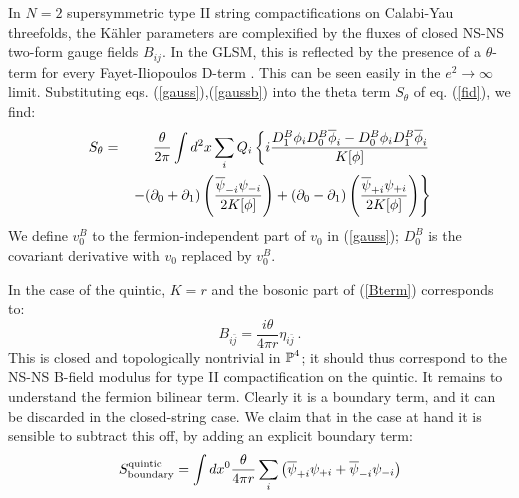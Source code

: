 \documentclass[a4paper,12pt]{article}
\begin{document}
In $N=2$ supersymmetric 
type II string compactifications on Calabi-Yau
threefolds, the K\"ahler parameters
are complexified by the fluxes of closed
NS-NS two-form gauge fields $B_{ij}$. In the GLSM, this is
reflected by the presence of a $\theta$-term for every 
Fayet-Iliopoulos D-term \cite{wittenphases}.
This can be seen easily in the
$e^2 \rightarrow \infty$ limit.  Substituting
eqs. (\ref{gauss}),(\ref{gaussb}) into the theta term
$S_\theta$ of eq. (\ref{fid}), we find: 
\begin{eqnarray}
S_{\theta}&=&{\theta\over {2 \pi }} \int d^2 x  \sum_i Q_i\left\{ 
i{{D^B_1 \phi_i D^B_0 \overline{\phi}_i -
D^B_0 \phi_i D^B_1 \overline{\phi}_i}\over{K[\phi]}}\right. \nonumber \\
&& \left.-(\partial_0+\partial_1) 
\left({{\overline{\psi}_{-i} \psi_{-i}}\over
{2K[\phi]}}\right)
 +(\partial_0-\partial_1) \left({{\overline{\psi}_{+i} 
\psi_{+i}}\over{2K[\phi]}} \right)\right\}
\label{Bterm}
\end{eqnarray}
We define $v_0^B$ to the fermion-independent part
of $v_0$ in (\ref{gauss});
$D_0^B$ is the covariant derivative with $v_0$ replaced by
$v_0^B$.

In the case of the quintic, $K=r$ and the bosonic part of
(\ref{Bterm}) corresponds to:
\begin{equation}
	B_{i\bar{j}} = \frac{i\theta}{4\pi r} \eta_{i\bar{j}}\ .
\label{quinticbfield}
\end{equation}
This is closed and topologically nontrivial in $\mbox{$\mathbb P$}^4$;
it should thus correspond to the NS-NS B-field modulus
for type II compactification on the quintic.
It remains to understand the fermion bilinear term.
Clearly it is a boundary term, and
it can be discarded in the closed-string case.
We claim that in the case at hand it is sensible
to subtract this off, by adding an explicit boundary term:
\begin{equation}
S^{\rm quintic}_{\rm boundary}=\int dx^0\frac{\theta}{4\pi r}
\sum_i\left(\overline{\psi}_{+i}\psi_{+i}+
\overline{\psi}_{-i} \psi_{-i}\right)
\label{bdyxtra}
\end{equation}
\end{document}
